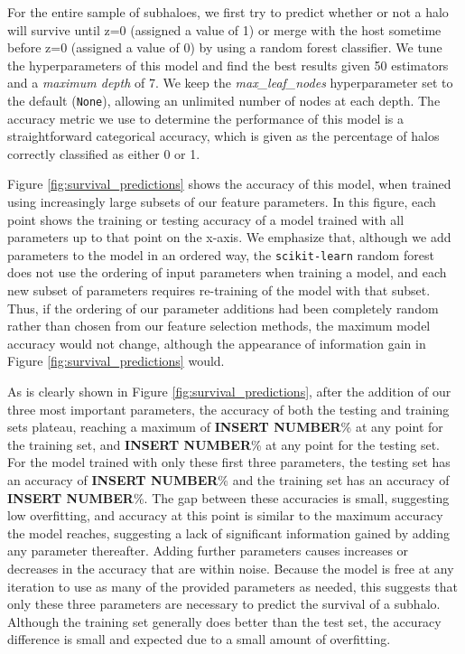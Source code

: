 \documentclass[fleqn,usenatbib]{mnras}
\begin{document}
For the entire sample of subhaloes, we first try to predict whether or not a halo will survive until z=0 (assigned a value of 1) or merge with the host sometime before z=0 (assigned a value of 0) by using a random forest classifier. We tune the hyperparameters of this model and find the best results given 50 estimators and a \textit{maximum depth} of 7. We keep the \textit{max\_leaf\_nodes} hyperparameter set to the default (\texttt{None}), allowing an unlimited number of nodes at each depth. The accuracy metric we use to determine the performance of this model is a straightforward categorical accuracy, which is given as the percentage of halos correctly classified as either 0 or 1.

Figure \ref{fig:survival_predictions} shows the accuracy of this model, when trained using increasingly large subsets of our feature parameters. In this figure, each point shows the training or testing accuracy of a model trained with all parameters up to that point on the x-axis. We emphasize that, although we add parameters to the model in an ordered way, the \texttt{scikit-learn} random forest does not use the ordering of input parameters when training a model, and each new subset of parameters requires re-training of the model with that subset. Thus, if the ordering of our parameter additions had been completely random rather than chosen from our feature selection methods, the maximum model accuracy would not change, although the appearance of information gain in Figure \ref{fig:survival_predictions} would. 

As is clearly shown in Figure \ref{fig:survival_predictions}, after the addition of our three most important parameters, the accuracy of both the testing and training sets plateau, reaching a maximum of \textbf{INSERT NUMBER}\% at any point for the training set, and \textbf{INSERT NUMBER}\% at any point for the testing set. For the model trained with only these first three parameters, the testing set has an accuracy of \textbf{INSERT NUMBER}\% and the training set has an accuracy of \textbf{INSERT NUMBER}\%. The gap between these accuracies is small, suggesting low overfitting, and accuracy at this point is similar to the maximum accuracy the model reaches, suggesting a lack of significant information gained by adding any parameter thereafter. Adding further parameters causes increases or decreases in the accuracy that are within noise. Because the model is free at any iteration to use as many of the provided parameters as needed, this suggests that only these three parameters are necessary to predict the survival of a subhalo. Although the training set generally does better than the test set, the accuracy difference is small and expected due to a small amount of overfitting.
\end{document}

